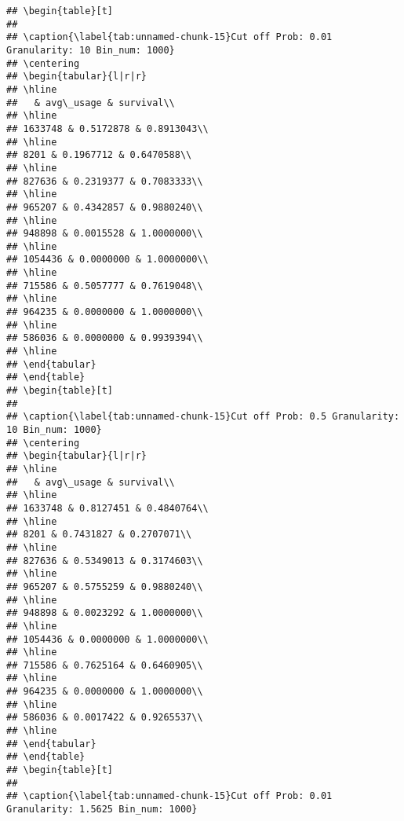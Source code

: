 \documentclass[]{article}
\begin{document}
\begin{verbatim}
## \begin{table}[t]
## 
## \caption{\label{tab:unnamed-chunk-15}Cut off Prob: 0.01 Granularity: 10 Bin_num: 1000}
## \centering
## \begin{tabular}{l|r|r}
## \hline
##   & avg\_usage & survival\\
## \hline
## 1633748 & 0.5172878 & 0.8913043\\
## \hline
## 8201 & 0.1967712 & 0.6470588\\
## \hline
## 827636 & 0.2319377 & 0.7083333\\
## \hline
## 965207 & 0.4342857 & 0.9880240\\
## \hline
## 948898 & 0.0015528 & 1.0000000\\
## \hline
## 1054436 & 0.0000000 & 1.0000000\\
## \hline
## 715586 & 0.5057777 & 0.7619048\\
## \hline
## 964235 & 0.0000000 & 1.0000000\\
## \hline
## 586036 & 0.0000000 & 0.9939394\\
## \hline
## \end{tabular}
## \end{table}
## \begin{table}[t]
## 
## \caption{\label{tab:unnamed-chunk-15}Cut off Prob: 0.5 Granularity: 10 Bin_num: 1000}
## \centering
## \begin{tabular}{l|r|r}
## \hline
##   & avg\_usage & survival\\
## \hline
## 1633748 & 0.8127451 & 0.4840764\\
## \hline
## 8201 & 0.7431827 & 0.2707071\\
## \hline
## 827636 & 0.5349013 & 0.3174603\\
## \hline
## 965207 & 0.5755259 & 0.9880240\\
## \hline
## 948898 & 0.0023292 & 1.0000000\\
## \hline
## 1054436 & 0.0000000 & 1.0000000\\
## \hline
## 715586 & 0.7625164 & 0.6460905\\
## \hline
## 964235 & 0.0000000 & 1.0000000\\
## \hline
## 586036 & 0.0017422 & 0.9265537\\
## \hline
## \end{tabular}
## \end{table}
## \begin{table}[t]
## 
## \caption{\label{tab:unnamed-chunk-15}Cut off Prob: 0.01 Granularity: 1.5625 Bin_num: 1000}

\end{verbatim}
\end{document}
